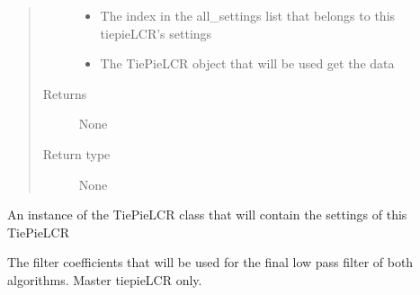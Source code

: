 \documentclass[letterpaper,10pt,english]{sphinxmanual}
\begin{document}
\begin{fulllineitems}
\begin{fulllineitems}
\begin{quote}
\begin{description}
\begin{itemize}
\item {} 
\sphinxAtStartPar
{} \textendash{} The index in the all\_settings list that belongs to this tiepieLCR’s settings

\item {} 
\sphinxAtStartPar
{} \textendash{} The TiePieLCR object that will be used get the data

\end{itemize}

\item[{Returns}] \leavevmode
\sphinxAtStartPar
None

\item[{Return type}] \leavevmode
\sphinxAtStartPar
None

\end{description}\end{quote}

\end{fulllineitems}


\begin{fulllineitems}
\label{\detokenize{index:TiePieLCR.TiePieLCR.settings}}
\sphinxAtStartPar
An instance of the TiePieLCR class that will contain the settings of this TiePieLCR

\end{fulllineitems}


\begin{fulllineitems}
\label{\detokenize{index:TiePieLCR.TiePieLCR.sos_decimate}}
\sphinxAtStartPar
The filter coefficients that will be used for the final low pass filter of both algorithms. Master tiepieLCR only.

\end{fulllineitems}



\end{fulllineitems}
\end{document}
